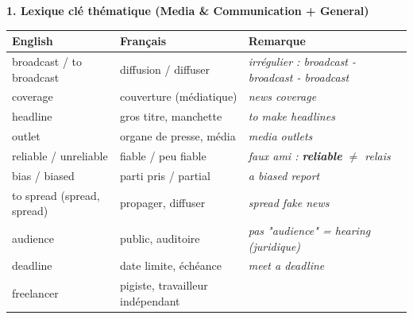 \documentclass[11pt]{article}
\newcommand{\eng}[1]{\ifmmode\text{\textit{#1}}\else\begingroup\selectlanguage{english}\itshape #1\endgroup\fi}
\begin{document}
\begin{bilan}

\textbf{1. Lexique clé thématique (Media \& Communication + General)}
\begin{center}
\begin{tabularx}{\linewidth}{|X|X|X|}
\hline
\rowcolor{popblueL} \textbf{English} & \textbf{Français} & \textbf{Remarque} \\
\hline
broadcast / to broadcast & diffusion / diffuser & \emph{irrégulier : broadcast - broadcast - broadcast} \\
coverage & couverture (médiatique) & \eng{news coverage} \\
headline & gros titre, manchette & \eng{to make headlines} \\
outlet & organe de presse, média & \eng{media outlets} \\
reliable / unreliable & fiable / peu fiable & \emph{faux ami : \textbf{reliable} $\neq$ relais} \\
bias / biased & parti pris / partial & \eng{a biased report} \\
to spread (spread, spread) & propager, diffuser & \eng{spread fake news} \\
audience & public, auditoire & \emph{pas "audience" = hearing (juridique)} \\
deadline & date limite, échéance & \eng{meet a deadline} \\
freelancer & pigiste, travailleur indépendant & \\
\hline
\end{tabularx}
\end{center}


\end{bilan}
\end{document}
